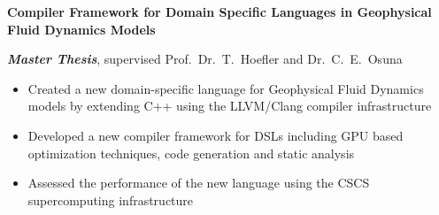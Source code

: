 
\textbf{Compiler Framework for Domain Specific Languages in Geophysical Fluid Dynamics Models}

\textbf{\textit{Master Thesis}}, supervised Prof.\ Dr.\ T.\ Hoefler and Dr.\ C.\ E.\ Osuna

\begin{itemize}
	\item Created a new domain-specific language for Geophysical Fluid Dynamics models by extending C++ using the LLVM/Clang compiler infrastructure
	\item Developed a new compiler framework for DSLs including GPU based optimization techniques, code generation and static analysis 
	\item Assessed the performance of the new language using the CSCS supercomputing infrastructure
\end{itemize}
